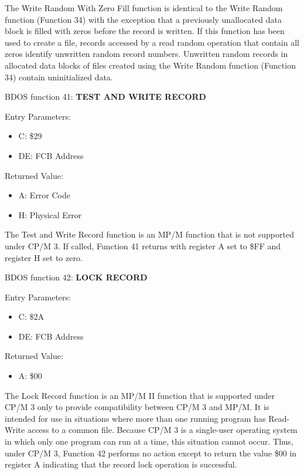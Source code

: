 The Write Random With Zero Fill function is identical to the Write
Random function (Function 34) with the exception that a previously
unallocated data block is filled with zeros before the record is
written. If this function has been used to create a file, records
accessed by a read random operation that contain all zeros identify
unwritten random record numbers. Unwritten random records in allocated
data blocks of files created using the Write Random function (Function
34) contain uninitialized data.

BDOS function 41: \textbf{TEST AND WRITE RECORD}

Entry Parameters:
\begin{itemize}
\item[] C: \$29
\item[] DE: FCB Address
\end{itemize}

Returned Value:
\begin{itemize}
\item[] A: Error Code
\item[] H: Physical Error
\end{itemize}

The Test and Write Record function is an MP/M function that is not
supported under CP/M 3. If called, Function 41 returns with register A
set to \$FF and register H set to zero.

BDOS function 42: \textbf{LOCK RECORD}

Entry Parameters:
\begin{itemize}
\item[] C: \$2A
\item[] DE: FCB Address
\end{itemize}

Returned Value:
\begin{itemize}
\item[] A: \$00
\end{itemize}

The Lock Record function is an MP/M II function that is supported
under CP/M 3 only to provide compatibility between CP/M 3 and MP/M. It
is intended for use in situations where more than one running program
has Read-Write access to a common file. Because CP/M 3 is a
single-user operating system in which only one program can run at a
time, this situation cannot occur. Thus, under CP/M 3, Function 42
performs no action except to return the value \$00 in register A
indicating that the record lock operation is successful.

